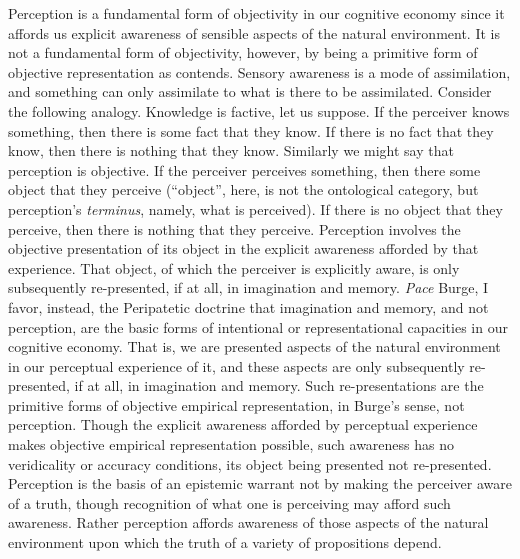 Perception is a fundamental form of objectivity in our cognitive economy since it affords us explicit awareness of sensible aspects of the natural environment. It is not a fundamental form of objectivity, however, by being a primitive form of objective representation as \cite{Burge:2010uq} contends. Sensory awareness is a mode of assimilation, and something can only assimilate to what is there to be assimilated. Consider the following analogy. Knowledge is factive, let us suppose. If the perceiver knows something, then there is some fact that they know. If there is no fact that they know, then there is nothing that they know. Similarly we might say that perception is objective. If the perceiver perceives something, then there some object that they perceive (``object'', here, is not the ontological category, but perception's \emph{terminus}, namely, what is perceived). If there is no object that they perceive, then there is nothing that they perceive. Perception involves the objective presentation of its object in the explicit awareness afforded by that experience. That object, of which the perceiver is explicitly aware, is only subsequently re-presented, if at all, in imagination and memory. \emph{Pace} Burge, I favor, instead, the Peripatetic doctrine that imagination and memory, and not perception, are the basic forms of intentional or representational capacities in our cognitive economy. That is, we are presented aspects of the natural environment in our perceptual experience of it, and these aspects are only subsequently re-presented, if at all, in imagination and memory. Such re-presentations are the primitive forms of objective empirical representation, in Burge's sense, not perception. Though the explicit awareness afforded by perceptual experience makes objective empirical representation possible, such awareness has no veridicality or accuracy conditions, its object being presented not re-presented. Perception is the basis of an epistemic warrant not by making the perceiver aware of a truth, though recognition of what one is perceiving may afford such awareness. Rather perception affords awareness of those aspects of the natural environment upon which the truth of a variety of propositions depend.

